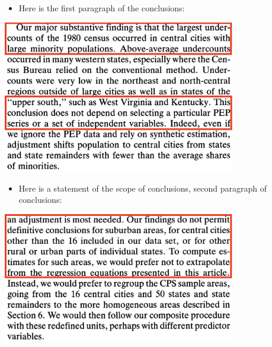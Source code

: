 \documentclass[landscape]{article}
\providecommand{\tightlist}{%
  \setlength{\itemsep}{0pt}\setlength{\parskip}{0pt}}
\begin{document}
\begin{itemize}
\tightlist
\item
  Here is the first paragraph of the conclusions:
\end{itemize}

\includegraphics[width=4in]{Ericksen_conclusions.png}

\begin{itemize}
\tightlist
\item
  Here is a statement of the scope of conclusions, second paragraph of
  conclusions:
\end{itemize}

\includegraphics[width=4in]{Ericksen_scope.png}
\end{document}

